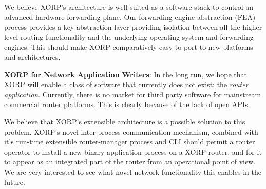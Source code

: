 We believe XORP's architecture is well suited as a software stack to
control an advanced hardware forwarding plane.  Our forwarding engine
abstraction (FEA) process provides a key abstraction layer providing
isolation between all the higher level routing functionality and the
underlying operating system and forwarding engines.  This should make
XORP comparatively easy to port to new platforms and architectures.

\vspace{0.1in}\noindent\textbf{XORP for Network Application Writers}:
In the long run, we hope that XORP will enable a class of software
that currently does not exist: the \textit{router application}.  Currently,
there is no market for third party software for mainstream commercial
router platforms.  This is clearly because of the lack of open APIs.

We believe that XORP's extensible architecture is a possible solution
to this problem.  XORP's novel inter-process communication mechanism,
combined with it's run-time extensible router-manager process and
CLI should permit a router operator to install a
new binary application process on a XORP router, and for it to appear
as an integrated part of the router from an operational point of view.
We are very interested to see what novel network functionality this
enables in the future.
